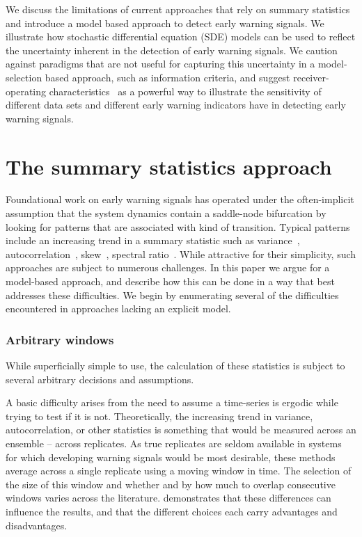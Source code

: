\documentclass[authoryear,review,11pt]{elsarticle}
\begin{document}
We discuss the limitations of current approaches that rely on summary statistics
and introduce a model based approach to detect early warning signals.
We illustrate how stochastic differential equation (SDE) models can be used 
to reflect the uncertainty inherent in the detection of early warning signals.
We caution against paradigms that are not useful for capturing this uncertainty in 
a model-selection based approach, such as information criteria,
and suggest receiver-operating characteristics~\citep{Green1989, Keller2009}
as a powerful way to illustrate the sensitivity of different data sets 
and different early warning indicators have in detecting early warning signals.  


\section{The summary statistics approach}
Foundational work on early warning signals has operated under the often-implicit assumption 
that the system dynamics contain a saddle-node bifurcation by
looking for patterns that are associated with kind of transition.
Typical patterns include an increasing trend in a summary statistic such as
variance~\citep{Carpenter2006}, autocorrelation~\citep{Held2004, Dakos2008},
skew~\citep{Guttal2008}, spectral ratio~\citep{Biggs2009}.
While attractive for their simplicity, such approaches are subject to numerous challenges.
In this paper we argue for a model-based approach, 
and describe how this can be done in a way that best addresses these difficulties.
We begin by enumerating several of the difficulties encountered in approaches lacking an explicit model. 


\subsubsection*{Arbitrary windows}
While superficially simple to use,
the calculation of these statistics is subject to several arbitrary decisions and assumptions.

A basic difficulty arises from the need to assume a time-series is ergodic 
while trying to test if it is not.  
Theoretically, the increasing trend in variance, autocorrelation, or other statistics
is something that would be measured across an ensemble -- across replicates. %
As true replicates are seldom available in systems for which developing warning signals would be most desirable,
these methods average across a single replicate using a moving window in time.  
The selection of the size of this window and whether and by how much to overlap consecutive windows
varies across the literature.  
\citet{Lenton2012} demonstrates that these differences can influence the results, 
and that the different choices each carry advantages and disadvantages.
\end{document}
